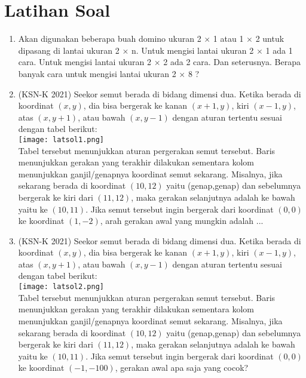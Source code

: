 		    \section{Latihan Soal}
		    \begin{enumerate}
		    \item Akan digunakan beberapa buah domino ukuran 2 $\times$ 1 atau 1 $\times$ 2 untuk dipasang di lantai ukuran 2 $\times$ n.
		    Untuk mengisi lantai ukuran 2 $\times$ 1 ada 1 cara.
		    Untuk mengisi lantai ukuran 2 $\times$ 2 ada 2 cara. Dan seterusnya.
		    Berapa banyak cara untuk mengisi lantai ukuran 2 $\times$ 8 ?
		    
		    \item (KSN-K 2021) Seekor semut berada di bidang dimensi dua. Ketika berada di koordinat $(x,y)$, dia bisa 
	 	    bergerak ke kanan $(x+1,y)$, kiri $(x-1,y)$, atas $(x,y+1)$, atau bawah $(x,y-1)$ dengan aturan 
	 	    tertentu sesuai dengan tabel berikut:\\
	 	    	\texttt{[image: latsol1.png]}\\
	 	    Tabel tersebut menunjukkan aturan pergerakan semut tersebut. Baris menunjukkan 
	 	    gerakan yang terakhir dilakukan sementara kolom menunjukkan ganjil/genapnya
	 	    koordinat semut sekarang. Misalnya, jika sekarang berada di koordinat $(10,12)$ yaitu 
	 	    (genap,genap) dan sebelumnya bergerak ke kiri dari $(11,12)$, maka gerakan selanjutnya 
	 	    adalah ke bawah yaitu ke $(10,11)$. Jika semut tersebut ingin bergerak dari koordinat $(0,0)$
	 	    ke koordinat $(1,-2)$, arah gerakan awal yang mungkin adalah ...
	 	    
	 	    \item (KSN-K 2021) Seekor semut berada di bidang dimensi dua. Ketika berada di koordinat $(x,y)$, dia bisa 
	 	     	    bergerak ke kanan $(x+1,y)$, kiri $(x-1,y)$, atas $(x,y+1)$, atau bawah $(x,y-1)$ dengan aturan 
	 	     	    tertentu sesuai dengan tabel berikut:\\
	 	     	    \texttt{[image: latsol2.png]}\\
	 	    Tabel tersebut menunjukkan aturan pergerakan semut tersebut. Baris menunjukkan 
	 	    gerakan yang terakhir dilakukan sementara kolom menunjukkan ganjil/genapnya
	 	    koordinat semut sekarang. Misalnya, jika sekarang berada di koordinat $(10,12)$ yaitu 
	 	    (genap,genap) dan sebelumnya bergerak ke kiri dari $(11,12)$, maka gerakan selanjutnya 
	 	    adalah ke bawah yaitu ke $(10,11)$. Jika semut tersebut ingin bergerak dari koordinat $(0,0)$
	 	    ke koordinat $(-1,-100)$, gerakan awal apa saja yang cocok?
	 	    

\end{enumerate}
